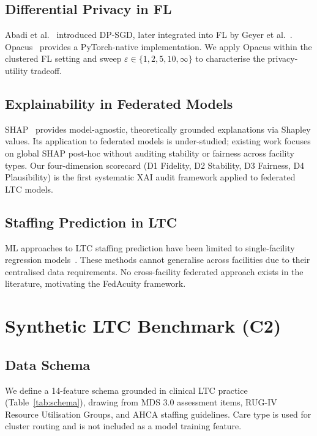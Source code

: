 \documentclass[journal]{IEEEtran}
\begin{document}
\subsection{Differential Privacy in FL}
Abadi et al.~\cite{abadi2016} introduced DP-SGD, later integrated into FL
by Geyer et al.~\cite{geyer2017}. Opacus~\cite{yousefpour2021} provides a
PyTorch-native implementation. We apply Opacus within the clustered FL setting
and sweep $\varepsilon \in \{1, 2, 5, 10, \infty\}$ to characterise the
privacy-utility tradeoff.

\subsection{Explainability in Federated Models}
SHAP~\cite{lundberg2017} provides model-agnostic, theoretically grounded
explanations via Shapley values. Its application to federated models is
under-studied; existing work focuses on global SHAP post-hoc without auditing
stability or fairness across facility types. Our four-dimension scorecard
(D1 Fidelity, D2 Stability, D3 Fairness, D4 Plausibility) is the first
systematic XAI audit framework applied to federated LTC models.

\subsection{Staffing Prediction in LTC}
ML approaches to LTC staffing prediction have been limited to single-facility
regression models~\cite{dellefield2015staffing,bates2021ml_ltc}. These methods
cannot generalise across facilities due to their centralised data requirements.
No cross-facility federated approach exists in the literature, motivating
the FedAcuity framework.

\section{Synthetic LTC Benchmark (C2)}
\label{sec:data}

\subsection{Data Schema}
We define a 14-feature schema grounded in clinical LTC practice
(Table~\ref{tab:schema}), drawing from MDS 3.0 assessment items, RUG-IV
Resource Utilisation Groups, and AHCA staffing guidelines. Care type
is used for cluster routing and is not included as a model training feature.
\end{document}
